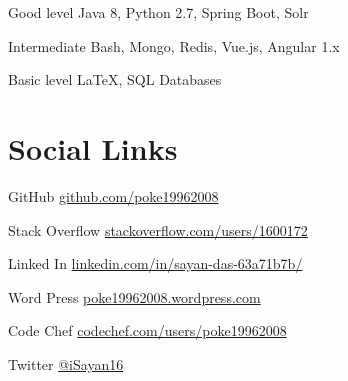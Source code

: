 \documentclass{tccv}
\begin{document}
\begin{factlist}

\item{Good level}
     {Java 8, Python 2.7, Spring Boot, Solr }

\item{Intermediate}
     {Bash, Mongo, Redis, Vue.js, Angular 1.x}

\item{Basic level}
     {\LaTeX, SQL Databases}

\end{factlist}

\section{Social Links}

\begin{factlist}

\item{GitHub}
     {\href{https://github.com/poke19962008}{github.com/poke19962008}}
\item{Stack Overflow}
     {\href{https://stackoverflow.com/users/1600172}{stackoverflow.com/users/1600172}}
\item{Linked In}
     {\href{https://www.linkedin.com/in/sayan-das-63a71b7b/}{linkedin.com/in/sayan-das-63a71b7b/}}
\item{Word Press}
     {\href{https://poke19962008.wordpress.com}{poke19962008.wordpress.com}}
\item{Code Chef}
     {\href{https://www.codechef.com/users/poke19962008}{codechef.com/users/poke19962008}}
\item{Twitter}
     {\href{https://twitter.com/iSayan16}{@iSayan16}}
     

\end{factlist}
\end{document}
